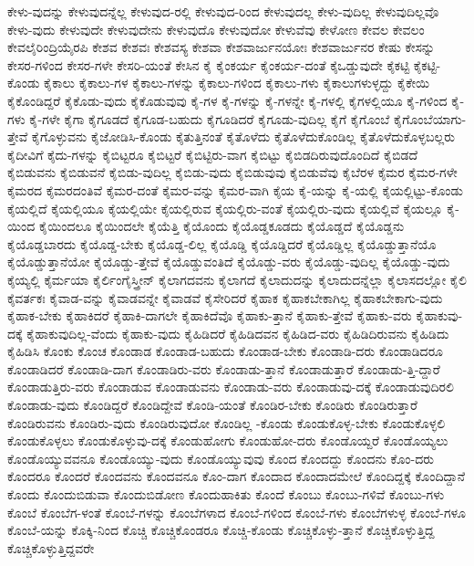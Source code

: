 {ಕೇಳು-ವುದನ್ನು
ಕೇಳುವುದನ್ನೆಲ್ಲ
ಕೇಳುವುದ-ರಲ್ಲಿ
ಕೇಳುವುದ-ರಿಂದ
ಕೇಳುವುದಲ್ಲ
ಕೇಳು-ವುದಿಲ್ಲ
ಕೇಳುವುದಿಲ್ಲವೊ
ಕೇಳು-ವುದು
ಕೇಳುವುದೇ
ಕೇಳುವುದೇನು
ಕೇಳುವುದೊ
ಕೇಳುವುದೋ
ಕೇಳುವೆವು
ಕೇಳೋಣ
ಕೇವಲ
ಕೇವಲಂ
ಕೇವಲೈರಿಂದ್ರಿಯೈರಪಿ
ಕೇಶವ
ಕೇಶವಃ
ಕೇಶವಸ್ಯ
ಕೇಶವಾ
ಕೇಶವಾರ್ಜುನಯೋಃ
ಕೇಶವಾರ್ಜುನರ
ಕೇಷು
ಕೇಸನ್ನು
ಕೇಸರ-ಗಳಿಂದ
ಕೇಸರ-ಗಳೇ
ಕೇಸರಿ-ಯಂತೆ
ಕೇಸಿನ
ಕೈ
ಕೈಂಕರ್ಯ
ಕೈಂಕರ್ಯ-ದಂತೆ
ಕೈಒಡ್ಡುವುದೇ
ಕೈಕಟ್ಟಿ
ಕೈಕಟ್ಟಿ-ಕೊಂಡು
ಕೈಕಾಲು
ಕೈಕಾಲು-ಗಳ
ಕೈಕಾಲು-ಗಳನ್ನು
ಕೈಕಾಲು-ಗಳಿಂದ
ಕೈಕಾಲು-ಗಳು
ಕೈಕಾಲುಗಳುಳ್ಳದ್ದು
ಕೈಕೇಯಿ
ಕೈಕೊಂಡಿದ್ದರೆ
ಕೈಕೊಡು-ವುದು
ಕೈಕೊಡುವುವು
ಕೈ-ಗಳ
ಕೈ-ಗಳನ್ನು
ಕೈ-ಗಳನ್ನೇ
ಕೈ-ಗಳಲ್ಲಿ
ಕೈಗಳಲ್ಲಿಯೂ
ಕೈ-ಗಳಿಂದ
ಕೈ-ಗಳು
ಕೈ-ಗಳೇ
ಕೈಗಾ
ಕೈಗೂಡದೆ
ಕೈಗೂಡ-ಬಹುದು
ಕೈಗೂಡಿದರೆ
ಕೈಗೂಡು-ವುದಿಲ್ಲ
ಕೈಗೆ
ಕೈಗೊಂಬೆ
ಕೈಗೊಂಬೆಯಾಗು-ತ್ತೇವೆ
ಕೈಗೊಳ್ಳುವನು
ಕೈಜೋಡಿಸಿ-ಕೊಂಡು
ಕೈತುತ್ತಿನಂತೆ
ಕೈತೊಳೆದು
ಕೈತೊಳೆದುಕೊಂಡಿಲ್ಲ
ಕೈತೊಳೆದುಕೊಳ್ಳಬಲ್ಲರು
ಕೈದೀವಿಗೆ
ಕೈದು-ಗಳನ್ನು
ಕೈಬಿಟ್ಟರೂ
ಕೈಬಿಟ್ಟರೆ
ಕೈಬಿಟ್ಟಿರು-ವಾಗ
ಕೈಬಿಟ್ಟು
ಕೈಬಿಡದಿರುವುದೊಂದಿದೆ
ಕೈಬಿಡದೆ
ಕೈಬಿಡುವನು
ಕೈಬಿಡುವನೆ
ಕೈಬಿಡು-ವುದಿಲ್ಲ
ಕೈಬಿಡು-ವುದು
ಕೈಬಿಡುವುವು
ಕೈಬಿಡುವೆವು
ಕೈಬೆರಳ
ಕೈಮರ
ಕೈಮರ-ಗಳೇ
ಕೈಮರದ
ಕೈಮರದಂತಿವೆ
ಕೈಮರ-ದಂತೆ
ಕೈಮರ-ವನ್ನು
ಕೈಮರ-ವಾಗಿ
ಕೈಯ
ಕೈ-ಯನ್ನು
ಕೈ-ಯಲ್ಲಿ
ಕೈಯಲ್ಲಿಟ್ಟು-ಕೊಂಡು
ಕೈಯಲ್ಲಿದೆ
ಕೈಯಲ್ಲಿಯೂ
ಕೈಯಲ್ಲಿಯೇ
ಕೈಯಲ್ಲಿರುವ
ಕೈಯಲ್ಲಿರು-ವಂತೆ
ಕೈಯಲ್ಲಿರು-ವುದು
ಕೈಯಲ್ಲಿವೆ
ಕೈಯಲ್ಲೂ
ಕೈ-ಯಿಂದ
ಕೈಯಿಂದಲೂ
ಕೈಯಿಂದಲೇ
ಕೈಯೆತ್ತಿ
ಕೈಯೊಂದು
ಕೈಯೊಡ್ಡಕೂಡದು
ಕೈಯೊಡ್ಡದೆ
ಕೈಯೊಡ್ಡನು
ಕೈಯೊಡ್ಡಬಾರದು
ಕೈಯೊಡ್ಡ-ಬೇಕು
ಕೈಯೊಡ್ಡ-ಲಿಲ್ಲ
ಕೈಯೊಡ್ಡಿ
ಕೈಯೊಡ್ಡಿದರೆ
ಕೈಯೊಡ್ಡಿಲ್ಲ
ಕೈಯೊಡ್ಡುತ್ತಾನೆಯೊ
ಕೈಯೊಡ್ಡುತ್ತಾನೆಯೋ
ಕೈಯೊಡ್ಡು-ತ್ತೇವೆ
ಕೈಯೊಡ್ಡುವಂತಿದೆ
ಕೈಯೊಡ್ಡು-ವರು
ಕೈಯೊಡ್ಡು-ವುದಿಲ್ಲ
ಕೈಯೊಡ್ಡು-ವುದು
ಕೈಯ್ಯಲ್ಲಿ
ಕೈರ್ಮಯಾ
ಕೈರ್ಲಿಂಗೈಸ್ತ್ರೀನ್
ಕೈಲಾಗದವನು
ಕೈಲಾಗದೆ
ಕೈಲಾದುದನ್ನು
ಕೈಲಾದುದನ್ನೆಲ್ಲಾ
ಕೈಲಾಸದಲ್ಲೋ
ಕೈಲಿ
ಕೈವರ್ತಕಃ
ಕೈವಾಡ-ವನ್ನು
ಕೈವಾಡವನ್ನೇ
ಕೈವಾಡವೆ
ಕೈಸೇರಿದರೆ
ಕೈಹಾಕ
ಕೈಹಾಕಬೇಕಾಗಿಲ್ಲ
ಕೈಹಾಕಬೇಕಾಗು-ವುದು
ಕೈಹಾಕ-ಬೇಕು
ಕೈಹಾಕಿದರೆ
ಕೈಹಾಕಿ-ದಾಗಲೇ
ಕೈಹಾಕಿದೆವೊ
ಕೈಹಾಕು-ತ್ತಾನೆ
ಕೈಹಾಕು-ತ್ತೇವೆ
ಕೈಹಾಕು-ವರು
ಕೈಹಾಕುವು-ದಕ್ಕೆ
ಕೈಹಾಕುವುದಿಲ್ಲ-ವೆಂದು
ಕೈಹಾಕು-ವುದು
ಕೈಹಿಡಿದರೆ
ಕೈಹಿಡಿದವನ
ಕೈಹಿಡಿದ-ವರು
ಕೈಹಿಡಿದಿರುವನು
ಕೈಹಿಡಿದು
ಕೈಹಿಡಿಸಿ
ಕೊಂಕು
ಕೊಂಚ
ಕೊಂಡಾಡ
ಕೊಂಡಾಡ-ಬಹುದು
ಕೊಂಡಾಡ-ಬೇಕು
ಕೊಂಡಾಡಿ-ದರು
ಕೊಂಡಾಡಿದರೂ
ಕೊಂಡಾಡಿದರೆ
ಕೊಂಡಾಡಿ-ದಾಗ
ಕೊಂಡಾಡಿರು-ವರು
ಕೊಂಡಾಡು-ತ್ತಾನೆ
ಕೊಂಡಾಡುತ್ತಾರೆ
ಕೊಂಡಾಡು-ತ್ತಿ-ದ್ದಾರೆ
ಕೊಂಡಾಡುತ್ತಿರು-ವರು
ಕೊಂಡಾಡುವ
ಕೊಂಡಾಡುವನು
ಕೊಂಡಾಡು-ವರು
ಕೊಂಡಾಡುವು-ದಕ್ಕೆ
ಕೊಂಡಾಡುವುದಿರಲಿ
ಕೊಂಡಾಡು-ವುದು
ಕೊಂಡಿದ್ದರೆ
ಕೊಂಡಿದ್ದೇವೆ
ಕೊಂಡಿ-ಯಂತೆ
ಕೊಂಡಿರ-ಬೇಕು
ಕೊಂಡಿರು
ಕೊಂಡಿರುತ್ತಾರೆ
ಕೊಂಡಿರುವನು
ಕೊಂಡಿರು-ವುದು
ಕೊಂಡಿರುವುದೋ
ಕೊಂಡಿಲ್ಲ
-ಕೊಂಡು
ಕೊಂಡುಕೊಳ್ಳ-ಬೇಕು
ಕೊಂಡುಕೊಳ್ಳಲಿ
ಕೊಂಡುಕೊಳ್ಳಲು
ಕೊಂಡುಕೊಳ್ಳುವು-ದಕ್ಕೆ
ಕೊಂಡುಹೋಗು
ಕೊಂಡುಹೋ-ದರು
ಕೊಂಡೊಯ್ದರೆ
ಕೊಂಡೊಯ್ಯಲು
ಕೊಂಡೊಯ್ಯುವವನೂ
ಕೊಂಡೊಯ್ಯು-ವುದು
ಕೊಂಡೊಯ್ಯುವುವು
ಕೊಂದ
ಕೊಂದದ್ದು
ಕೊಂದನು
ಕೊಂ-ದರು
ಕೊಂದರೂ
ಕೊಂದರೆ
ಕೊಂದವನು
ಕೊಂದವನೂ
ಕೊಂ-ದಾಗ
ಕೊಂದಾದ
ಕೊಂದಾದಮೇಲೆ
ಕೊಂದಿದ್ದಕ್ಕೆ
ಕೊಂದಿದ್ದಾನೆ
ಕೊಂದು
ಕೊಂದುಬಿಡುವಾ
ಕೊಂದುಬಿಡೋಣ
ಕೊಂದುಹಾಕಿತು
ಕೊಂದೆ
ಕೊಂಬು
ಕೊಂಬು-ಗಳಿವೆ
ಕೊಂಬು-ಗಳು
ಕೊಂಬೆ
ಕೊಂಬೆಗ-ಳಂತೆ
ಕೊಂಬೆ-ಗಳನ್ನು
ಕೊಂಬೆಗಳಾದ
ಕೊಂಬೆ-ಗಳಿಂದ
ಕೊಂಬೆ-ಗಳು
ಕೊಂಬೆಗಳುಳ್ಳ
ಕೊಂಬೆ-ಗಳೂ
ಕೊಂಬೆ-ಯನ್ನು
ಕೊಕ್ಕಿ-ನಿಂದ
ಕೊಚ್ಚಿ
ಕೊಚ್ಚಿಕೊಂಡರೂ
ಕೊಚ್ಚಿ-ಕೊಂಡು
ಕೊಚ್ಚಿಕೊಳ್ಳು-ತ್ತಾನೆ
ಕೊಚ್ಚಿಕೊಳ್ಳುತ್ತಿದ್ದ
ಕೊಚ್ಚಿಕೊಳ್ಳುತ್ತಿದ್ದವರೇ
}
